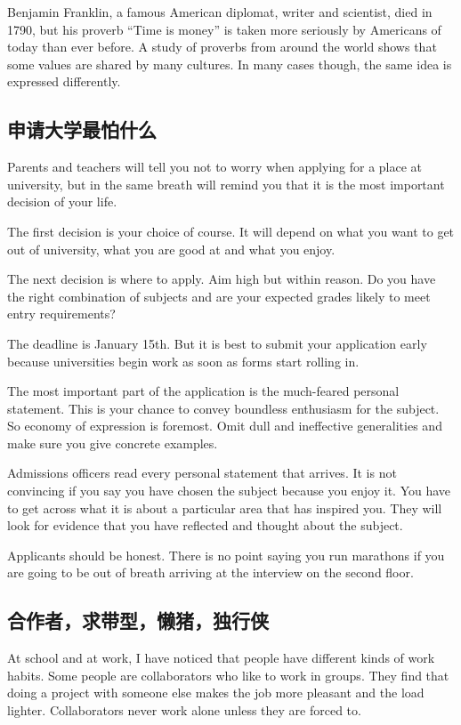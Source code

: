 Benjamin Franklin, a famous American diplomat, writer
and scientist, died in 1790, but his proverb “Time is money”
is taken more seriously by Americans of today than ever
before. A study of proverbs from around the world
shows that some values are shared by many cultures. In
many cases though, the same idea is expressed differently.
\subsection{申请大学最怕什么}
Parents and teachers will tell you not to worry when applying
for a place at university, but in the same breath will remind
you that it is the most important decision of your life.

The first decision is your choice of course. It will depend
on what you want to get out of university, what you
are good at and what you enjoy.

The next decision is where to apply. Aim high but within
reason. Do you have the right combination of subjects and
are your expected grades likely to meet entry requirements?

The deadline is January 15th. But it is best to submit your
application early because universities begin work as soon
as forms start rolling in.

The most important part of the application is the
much-feared personal statement. This is your chance to
convey boundless enthusiasm for the subject. So economy
of expression is foremost. Omit dull and ineffective generalities
and make sure you give concrete examples.

Admissions officers read every personal statement that
arrives. It is not convincing if you say you have chosen
the subject because you enjoy it. You have to get across
what it is about a particular area that has inspired you.
They will look for evidence that you have reflected and
thought about the subject.

Applicants should be honest. There is no point saying you
run marathons if you are going to be out of breath arriving
at the interview on the second floor.
\subsection{合作者，求带型，懒猪，独行侠}
At school and at work, I have noticed that people have
different kinds of work habits. Some people are collaborators
who like to work in groups. They find that doing a project
with someone else makes the job more pleasant and
the load lighter. Collaborators never work alone
unless they are forced to.

